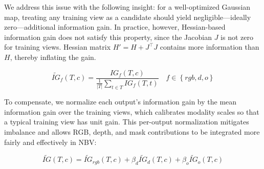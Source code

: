 
We address this issue with the following insight: for a well-optimized Gaussian map, treating any training view as a candidate should yield negligible—ideally zero—additional information gain. In practice, however, Hessian-based information gain does not satisfy this property, since the Jacobian $J$ is not zero for training views. Hessian matrix $H'=H+J^\top J$ contains more information than $H$, thereby inflating the gain.

{\small
\begin{equation}
\tilde{IG}_f(T,c) = \frac{IG_f(T,c)}{\frac{1}{|T|} \sum_{t \in T} IG_f(T,t)} \quad f \in \left\{ rgb, d, o \right\}
\end{equation}
}

To compensate, we normalize each output’s information gain by the mean information gain over the training views, which calibrates modality scales so that a typical training view has unit gain. This per-output normalization mitigates imbalance and allows RGB, depth, and mask contributions to be integrated more fairly and effectively in \ac{NBV}:

{\small
\begin{equation}
\tilde{IG}(T,c) = \tilde{IG}_{rgb}(T,c) + \beta_{d}\tilde{IG}_{d}(T,c) + \beta_{o}\tilde{IG}_{o}(T,c)
\end{equation}
}



